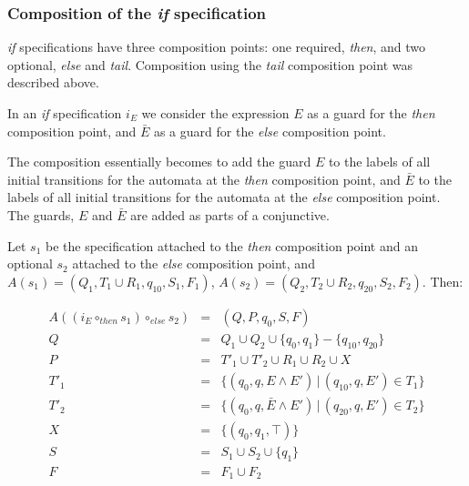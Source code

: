 \documentclass[a4paper,11pt]{kth-mag}
\begin{document}
\subsubsection{Composition of the \textit{if} specification}

\textit{if} specifications have three composition points: one required,
\textit{then}, and two optional, \textit{else} and \textit{tail}. Composition
using the \textit{tail} composition point was described above.

In an \textit{if} specification $i_E$ we consider the expression $E$ as a guard
for the \textit{then} composition point, and $\bar{E}$ as a guard for the
\textit{else} composition point.

The composition essentially becomes to add the guard $E$ to the labels of all
initial transitions for the automata at the \textit{then} composition point,
and $\bar{E}$ to the labels of all initial transitions for the automata at the
\textit{else} composition point. The guards, $E$ and $\bar{E}$ are added as
parts of a conjunctive.

Let $s_1$ be the specification attached to the \textit{then} composition point
and an optional $s_2$ attached to the \textit{else} composition point, and
$A(s_1) = (Q_1, T_1 \cup R_1, q_{10}, S_1, F_1)$, $A(s_2) = (Q_2, T_2 \cup R_2,
q_{20}, S_2, F_2)$. Then:

\medskip
\[
  \begin{array}{rcl}
  A((i_E \circ_{then} s_1) \circ_{else} s_2) & = & (Q, P, q_0, S, F) \\
                                           Q & = & Q_1 \cup Q_2 \cup \{q_0, q_1\} - \{q_{10}, q_{20}\} \\
                                           P & = & T'_1 \cup T'_2 \cup R_1 \cup R_2 \cup X \\
                                        T'_1 & = & \{(q_0, q, E       \wedge E') \, | \, (q_{10}, q, E') \in T_1\} \\
                                        T'_2 & = & \{(q_0, q, \bar{E} \wedge E') \, | \, (q_{20}, q, E') \in T_2\} \\
                                           X & = & \{(q_0, q_1, \top)\} \\
                                           S & = & S_1 \cup S_2 \cup \{q_1\} \\
                                           F & = & F_1 \cup F_2
  \end{array}
\]
\medskip
\end{document}
